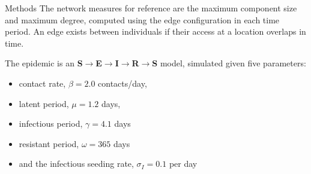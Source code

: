 \documentclass[final]{beamer} %
\newenvironment{oneCol}{\begin{column}[t]{0.225\paperwidth}}{\end{column}}
\begin{document}
\begin{frame}{}
\begin{columns}[t]
\begin{oneCol}
\begin{block}{Methods}
The network measures for reference are the maximum component size and maximum degree, computed using the edge configuration in each time period.  An edge exists between individuals if their access at a location overlaps in time.

The epidemic is an \textbf{S$\rightarrow$E$\rightarrow$I$\rightarrow$R$\rightarrow$S} model, simulated given five parameters:\begin{itemize}
\item contact rate, $\beta = 2.0$ contacts/day,
\item latent period, $\mu = 1.2$ days,
\item infectious period, $\gamma = 4.1$ days
\item resistant period, $\omega = 365$ days
\item and the infectious seeding rate, $\sigma_I = 0.1$ per day
\end{itemize}


\end{block}
\end{oneCol}
\end{columns}
\end{frame}
\end{document}
